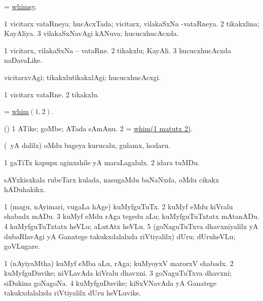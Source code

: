 \bentry
{} 
\gl{\nA}
\bmng
= \hyperlink{whimsy}{whimsy}. 
\emng
\eentry

\bentry
{} 
\gl{\gu}
\expl{}
\bmng
\bnum
\num{1} vicitarx vataRneya; hucAcxTada; vicitarx, vilakaSxNa -vataRneya. 
\num{2} tikakxlina; KayAliya. 
\num{3} vilakaSxNavAgi kANuva; hucucxhucAcxda. 
\enum
\emng
\eentry

\bentry
{} 
\gl{\nA}
\expl{}
\bmng
\bnum
\num{1} vicitarx, vilakaSxNa -- vataRne. 
\num{2} tikakxlu; KayAli. 
\num{3} hucucxhucAcxda naDavaLike. 
\enum
\emng
\eentry

\bentry
{} 
\gl{\kirxvi}
\expl{}
\bmng
vicitarxvAgi; tikakxlutikakxlAgi; hucucxhucAcxgi. 
\emng
\eentry

\bentry
{} 
\gl{\nA}
\expl{}
\bmng
\bnum
\num{1} vicitarx vataRne. 
\num{2} tikakxlu. 
\enum
\emng
\eentry

\bentry
{} 
\gl{\nA}
\bmng
= \hyperlink{whim}{whim\((1, 2)\)}. 
\emng
\eentry

\bentry
{} 
\gl{\nA}
\expl{}
\bmng
(\pArxparx) 
\bnum
\num{1} ATike; goMbe; ATada sAmAnu. 
\num{2} = \hyperlink{whim}{whim(1 matutx 2)}. 
\enum
\emng
\eentry

\bentry
{} 
\gl{\nA}
\expl{}
\bmng
(\Eva\ yA \bava dalilx) oMdu bageya kurucalu, gulamx, hodaru. 
\emng
\eentry

\bentry
{} 
\gl{\nA}
\expl{}
\bmng
\bnum
\num{1} gaTiTx kapupx aginxshile yA maraLagalulx. 
\num{2} idara tuMDu. 
\enum
\emng
\eentry

{} 
\gl{\nA}
\expl{}
\bmng
sAYxkisxkala rubeTarx kulada, nasugaMdu baNaNxda, oMdu cikakx hADuhakikx. 
\emng
\eentry

\bentry
{} 
\gl{\akirx}
\expl{}
\bmng
\bnum
\num{1} (magu, nAyimari, \mo vugaLa hAge) kuMyfguTuTx. 
\num{2} kuMyf eMdu kiVralu shabadx mADu. 
\num{3} kuMyf eMdu rAga tegedu aLu; kuMyfguTuTxtatx mAtanADu. 
\num{4} kuMyfguTuTxtatx heVLu; aLutAtx heVLu. 
\num{5} (goNaguTuTxva dhavxniyalilx yA dubaRlavAgi yA Ganatege takukxdalalxda riVtiyalilx) dUru; dUruheVLu; goVLugare. 
\enum
\emng
\eentry

\bentry
{} 
\gl{\nA}
\expl{}
\bmng
\bnum
\num{1} (nAyiyaMtha) kuMyf eMba aLu, rAga; kuMyoyxV marorxV shabadx. 
\num{2} kuMyfguDuvike; niVLavAda kiVralu dhavxni. 
\num{3} goNaguTuTxva dhavxni; siDukina goNagoNa. 
\num{4} kuMyfguDuvike; kiSxVNavAda yA Ganatege takukxdalalxda riVtiyalilx dUru heVLuvike. 
\enum
\emng
\eentry

